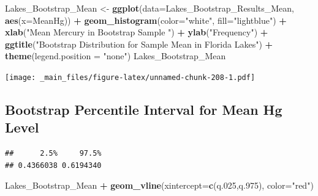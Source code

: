 \documentclass[]{book}
\newenvironment{Shaded}{\begin{snugshade}}{\end{snugshade}}
\newcommand{\KeywordTok}[1]{\textcolor[rgb]{0.13,0.29,0.53}{\textbf{#1}}}
\newcommand{\DataTypeTok}[1]{\textcolor[rgb]{0.13,0.29,0.53}{#1}}
\newcommand{\DecValTok}[1]{\textcolor[rgb]{0.00,0.00,0.81}{#1}}
\newcommand{\FloatTok}[1]{\textcolor[rgb]{0.00,0.00,0.81}{#1}}
\newcommand{\StringTok}[1]{\textcolor[rgb]{0.31,0.60,0.02}{#1}}
\newcommand{\OperatorTok}[1]{\textcolor[rgb]{0.81,0.36,0.00}{\textbf{#1}}}
\newcommand{\NormalTok}[1]{#1}
\begin{document}
\begin{Shaded}
\begin{Highlighting}[]
\NormalTok{Lakes_Bootstrap_Mean <-}\StringTok{ }\KeywordTok{ggplot}\NormalTok{(}\DataTypeTok{data=}\NormalTok{Lakes_Bootstrap_Results_Mean, }\KeywordTok{aes}\NormalTok{(}\DataTypeTok{x=}\NormalTok{MeanHg)) }\OperatorTok{+}\StringTok{  }
\StringTok{  }\KeywordTok{geom_histogram}\NormalTok{(}\DataTypeTok{color=}\StringTok{"white"}\NormalTok{, }\DataTypeTok{fill=}\StringTok{"lightblue"}\NormalTok{) }\OperatorTok{+}
\StringTok{  }\KeywordTok{xlab}\NormalTok{(}\StringTok{"Mean Mercury in Bootstrap Sample "}\NormalTok{) }\OperatorTok{+}\StringTok{ }\KeywordTok{ylab}\NormalTok{(}\StringTok{"Frequency"}\NormalTok{) }\OperatorTok{+}
\StringTok{  }\KeywordTok{ggtitle}\NormalTok{(}\StringTok{"Bootstrap Distribution for Sample Mean in Florida Lakes"}\NormalTok{) }\OperatorTok{+}\StringTok{ }
\StringTok{  }\KeywordTok{theme}\NormalTok{(}\DataTypeTok{legend.position =} \StringTok{"none"}\NormalTok{)}
\NormalTok{Lakes_Bootstrap_Mean}
\end{Highlighting}
\end{Shaded}

\texttt{[image: \_main\_files/figure-latex/unnamed-chunk-208-1.pdf]}

\subsection{Bootstrap Percentile Interval for Mean Hg
Level}\label{bootstrap-percentile-interval-for-mean-hg-level}

\begin{Shaded}
\end{Shaded}

\begin{verbatim}
##      2.5%     97.5% 
## 0.4366038 0.6194340
\end{verbatim}

\begin{Shaded}
\begin{Highlighting}[]
\NormalTok{Lakes_Bootstrap_Mean  }\OperatorTok{+}\StringTok{ }\KeywordTok{geom_vline}\NormalTok{(}\DataTypeTok{xintercept=}\KeywordTok{c}\NormalTok{(q.}\DecValTok{025}\NormalTok{,q.}\DecValTok{975}\NormalTok{), }\DataTypeTok{color=}\StringTok{"red"}\NormalTok{) }
\end{Highlighting}
\end{Shaded}
\end{document}
